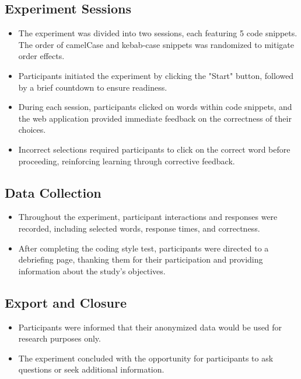 \documentclass{article}
\begin{document}
\subsection*{Experiment Sessions}

\begin{itemize}
  \item The experiment was divided into two sessions, each featuring 5 code snippets. The order of camelCase and kebab-case snippets was randomized to mitigate order effects.
  \item Participants initiated the experiment by clicking the "Start" button, followed by a brief countdown to ensure readiness.
  \item During each session, participants clicked on words within code snippets, and the web application provided immediate feedback on the correctness of their choices.
  \item Incorrect selections required participants to click on the correct word before proceeding, reinforcing learning through corrective feedback.
\end{itemize}

\subsection*{Data Collection}

\begin{itemize}
  \item Throughout the experiment, participant interactions and responses were recorded, including selected words, response times, and correctness.
  \item After completing the coding style test, participants were directed to a debriefing page, thanking them for their participation and providing information about the study's objectives.
\end{itemize}

\subsection*{Export and Closure}

\begin{itemize}
  \item Participants were informed that their anonymized data would be used for research purposes only.
  \item The experiment concluded with the opportunity for participants to ask questions or seek additional information.
\end{itemize}
\end{document}
